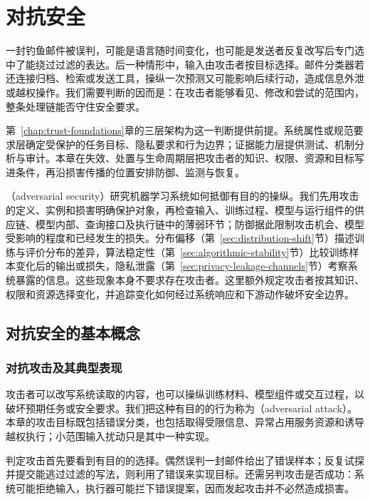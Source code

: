 \chapter{对抗安全}
\label{chap:trust-security}

一封钓鱼邮件被误判，可能是语言随时间变化，也可能是发送者反复改写后专门选中了能绕过过滤的表达。后一种情形中，输入由攻击者按目标选择。邮件分类器若还连接归档、检索或发送工具，操纵一次预测又可能影响后续行动，造成信息外泄或越权操作。我们需要判断的因而是：在攻击者能够看见、修改和尝试的范围内，整条处理链能否守住安全要求。

第~\ref{chap:trust-foundations}章的三层架构为这一判断提供前提。系统属性或规范要求层确定受保护的任务目标、隐私要求和行为边界；证据能力层提供测试、机制分析与审计。本章在失效、处置与生命周期层把攻击者的知识、权限、资源和目标写进条件，再沿损害传播的位置安排防御、监测与恢复。

（adversarial security）研究机器学习系统如何抵御有目的的操纵。我们先用攻击的定义、实例和损害明确保护对象，再检查输入、训练过程、模型与运行组件的供应链、模型内部、查询接口及执行链中的薄弱环节；防御据此限制攻击机会、模型受影响的程度和已经发生的损失。分布偏移（第~\ref{sec:distribution-shift}节）描述训练与评价分布的差异，算法稳定性（第~\ref{sec:algorithmic-stability}节）比较训练样本变化后的输出或损失，隐私泄露（第~\ref{sec:privacy-leakage-channels}节）考察系统暴露的信息。这些现象本身不要求存在攻击者。这里额外规定攻击者按其知识、权限和资源选择变化，并追踪变化如何经过系统响应和下游动作破坏安全边界。

\section{对抗安全的基本概念}
\label{sec:security-threats}

\subsection{对抗攻击及其典型表现}
\label{sec:security-attack-definition}

攻击者可以改写系统读取的内容，也可以操纵训练材料、模型组件或交互过程，以破坏预期任务或安全要求。我们把这种有目的的行为称为（adversarial attack）。本章的攻击目标既包括错误分类，也包括取得受限信息、异常占用服务资源和诱导越权执行；小范围输入扰动只是其中一种实现。

判定攻击首先要看到有目的的选择。偶然误判一封邮件给出了错误样本；反复试探并提交能逃过过滤的写法，则利用了错误来实现目标。还需另判攻击是否成功：系统可能拒绝输入，执行器可能拦下错误提案，因而发起攻击并不必然造成损害。

